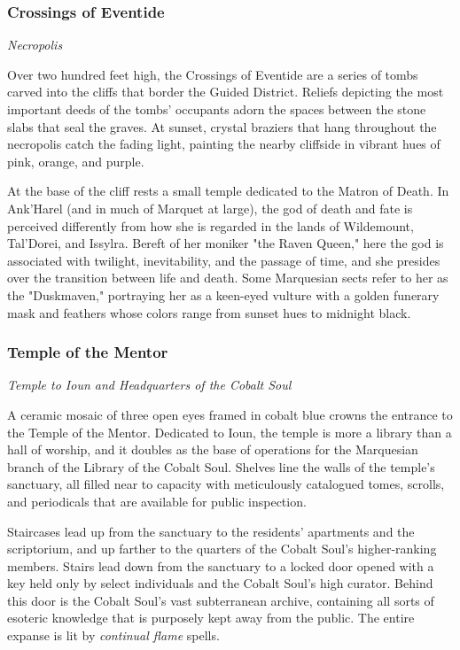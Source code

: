 \documentclass[10pt,a4paper,twoside,fancy,bg=print,twocolumn,openany,nodeprecatedcode]{dndbook}
\begin{document}
\subsubsection{Crossings of Eventide}
\textit{Necropolis}

Over two hundred feet high, the Crossings of Eventide are a series of tombs carved into the cliffs that border the Guided District. Reliefs depicting the most important deeds of the tombs' occupants adorn the spaces between the stone slabs that seal the graves. At sunset, crystal braziers that hang throughout the necropolis catch the fading light, painting the nearby cliffside in vibrant hues of pink, orange, and purple.

At the base of the cliff rests a small temple dedicated to the Matron of Death. In Ank'Harel (and in much of Marquet at large), the god of death and fate is perceived differently from how she is regarded in the lands of Wildemount, Tal'Dorei, and Issylra. Bereft of her moniker "the Raven Queen," here the god is associated with twilight, inevitability, and the passage of time, and she presides over the transition between life and death. Some Marquesian sects refer to her as the "Duskmaven," portraying her as a keen-eyed vulture with a golden funerary mask and feathers whose colors range from sunset hues to midnight black.

\subsubsection{Temple of the Mentor}
\textit{Temple to Ioun and Headquarters of the Cobalt Soul}

A ceramic mosaic of three open eyes framed in cobalt blue crowns the entrance to the Temple of the Mentor. Dedicated to Ioun, the temple is more a library than a hall of worship, and it doubles as the base of operations for the Marquesian branch of the Library of the Cobalt Soul. Shelves line the walls of the temple's sanctuary, all filled near to capacity with meticulously catalogued tomes, scrolls, and periodicals that are available for public inspection.

Staircases lead up from the sanctuary to the residents' apartments and the scriptorium, and up farther to the quarters of the Cobalt Soul's higher-ranking members. Stairs lead down from the sanctuary to a locked door opened with a key held only by select individuals and the Cobalt Soul's high curator. Behind this door is the Cobalt Soul's vast subterranean archive, containing all sorts of esoteric knowledge that is purposely kept away from the public. The entire expanse is lit by \textit{continual flame} spells.
\end{document}
